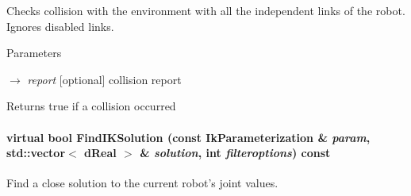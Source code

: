 Checks collision with the environment with all the independent links of the robot. Ignores disabled links. 


\begin{DoxyParams}{Parameters}
\item[\mbox{$\rightarrow$} {\em report}]\mbox{[}optional\mbox{]} collision report \end{DoxyParams}
\begin{DoxyReturn}{Returns}
true if a collision occurred 
\end{DoxyReturn}
\hypertarget{classOpenRAVE_1_1RobotBase_1_1Manipulator_afe8f72c898a5e9200f5132a2a58e52cb}{
\paragraph[{FindIKSolution}]{\setlength{\rightskip}{0pt plus 5cm}virtual bool FindIKSolution (const {\bf IkParameterization} \& {\em param}, \/  std::vector$<$ dReal $>$ \& {\em solution}, \/  int {\em filteroptions}) const}\hfill}
\label{classOpenRAVE_1_1RobotBase_1_1Manipulator_afe8f72c898a5e9200f5132a2a58e52cb}


Find a close solution to the current robot's joint values. 

